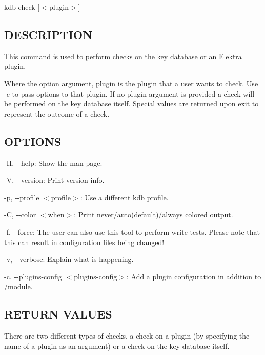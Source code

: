 {\ttfamily kdb check \mbox{[}$<$plugin$>$\mbox{]}}

\subsection*{D\+E\+S\+C\+R\+I\+P\+T\+I\+ON}

This command is used to perform checks on the key database or an Elektra plugin.

Where the option argument, {\ttfamily plugin} is the plugin that a user wants to check. Use {\ttfamily -\/c} to pass options to that plugin. If no {\ttfamily plugin} argument is provided a check will be performed on the key database itself. Special values are returned upon exit to represent the outcome of a check.

\subsection*{O\+P\+T\+I\+O\+NS}


\begin{DoxyItemize}
\item {\ttfamily -\/H}, {\ttfamily -\/-\/help}\+: Show the man page.
\item {\ttfamily -\/V}, {\ttfamily -\/-\/version}\+: Print version info.
\item {\ttfamily -\/p}, {\ttfamily -\/-\/profile $<$profile$>$}\+: Use a different kdb profile.
\item {\ttfamily -\/C}, {\ttfamily -\/-\/color $<$when$>$}\+: Print never/auto(default)/always colored output.
\item {\ttfamily -\/f}, {\ttfamily -\/-\/force}\+: The user can also use this tool to perform write tests. Please note that this can result in configuration files being changed!
\item {\ttfamily -\/v}, {\ttfamily -\/-\/verbose}\+: Explain what is happening.
\item {\ttfamily -\/c}, {\ttfamily -\/-\/plugins-\/config $<$plugins-\/config$>$}\+: Add a plugin configuration in addition to {\ttfamily /module}.
\end{DoxyItemize}

\subsection*{R\+E\+T\+U\+RN V\+A\+L\+U\+ES}

There are two different types of checks, a check on a plugin (by specifying the name of a plugin as an argument) or a check on the key database itself.

